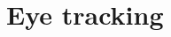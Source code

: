\documentclass[Bachelorarbeit.tex]{subfiles}
\begin{document}
\newpage
\section{Eye tracking}
\label{Eye tracking}

\FloatBarrier
\end{document}
